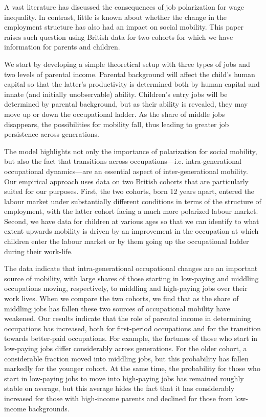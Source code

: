 A vast literature has discussed the consequences of job polarization for wage inequality. In contrast, little is known about whether the change in the employment structure has also had an impact on social mobility. This paper raises such question using British data for two cohorts for which we have information for parents and children.

We start by developing a simple theoretical setup with three types of jobs and two levels of parental income. Parental background will affect the child's human capital so that the latter’s productivity is determined both by human capital and innate (and initially unobservable) ability. Children’s entry jobs will be determined by parental background, but as their ability is revealed, they may move up or down the occupational ladder. As the share of middle jobs disappears, the possibilities for mobility fall, thus leading to greater job persistence across generations.

The model highlights not only the importance of polarization for social mobility, but also the fact that transitions across occupations---i.e. intra-generational occupational dynamics---are an essential aspect of inter-generational mobility. Our empirical approach uses data on two British cohorts that are particularly suited for our purposes. First, the two cohorts, born 12  years apart, entered the labour market under substantially different conditions in terms of the structure of employment, with the latter cohort facing a much more polarized labour market. Second, we have data for children at various ages so that we can identify to what extent upwards mobility is driven by an improvement in the occupation at which children enter the labour market or by them going up the occupational ladder during their work-life. 

The data indicate that intra-generational occupational changes are an important source of mobility, with large shares of those starting in low-paying and middling occupations moving, respectively, to middling and high-paying jobs over their work lives. When we compare the two cohorts, we find that as the share of middling jobs has fallen these two sources of occupational mobility have weakened. Our results indicate that the role of parental income in determining occupations has increased, both for first-period occupations and for the transition towards better-paid occupations. For example, the fortunes of those who start in low-paying jobs differ considerably across generations. For the older cohort, a considerable fraction moved into middling jobs, but this probability has fallen markedly for the younger cohort. At the same time, the probability for those who start in low-paying jobs to move into high-paying jobs has remained roughly stable on average, but this average hides the fact that it has considerably increased for those with high-income parents and declined for those from low-income backgrounds. 

